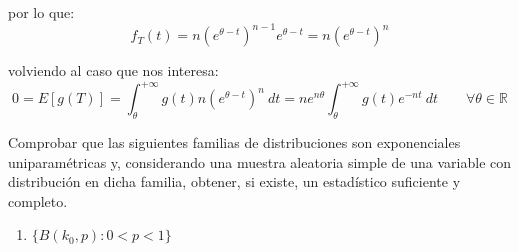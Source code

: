 \begin{ejercicio}
    por lo que:
    \begin{equation*}
        f_T(t) = n{\left(e^{\theta-t}\right)}^{n-1}e^{\theta-t} = n{\left(e^{\theta-t}\right)}^{n}
    \end{equation*}

    volviendo al caso que nos interesa:
    \begin{equation*}
        0 = E[g(T)] = \int_{\theta}^{+\infty} g(t)n{\left(e^{\theta-t}\right)}^{n} ~dt  = ne^{n\theta} \int_{\theta}^{+\infty} g(t)e^{-nt} ~dt  \qquad \forall \theta \in \mathbb{R}
    \end{equation*}
\end{ejercicio}

\begin{ejercicio}
    Comprobar que las siguientes familias de distribuciones son exponenciales uniparamétricas y, considerando una muestra aleatoria simple de una variable con distribución en dicha familia, obtener, si existe, un estadístico suficiente y completo.
    \begin{enumerate}[label=\alph*)]
        \item $\{B(k_0,p) : 0<p<1\}$


\end{enumerate}
\end{ejercicio}

